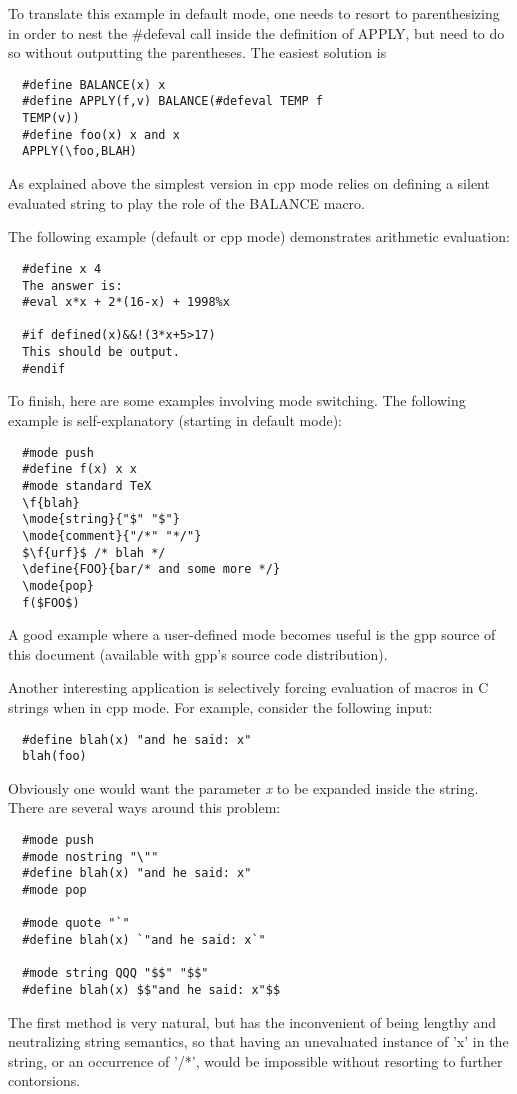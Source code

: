 To translate this example in default mode, one needs to resort to
parenthesizing in order to nest the \#defeval call inside the definition
of APPLY, but need to do so without outputting the parentheses. The
easiest solution is
\begin{verbatim}
  #define BALANCE(x) x
  #define APPLY(f,v) BALANCE(#defeval TEMP f
  TEMP(v))
  #define foo(x) x and x
  APPLY(\foo,BLAH)
\end{verbatim}
As explained above the simplest version in cpp mode relies on defining
a silent evaluated string to play the role of the BALANCE macro.


The following example (default or cpp mode) demonstrates arithmetic 
evaluation:
\begin{verbatim}
  #define x 4
  The answer is:
  #eval x*x + 2*(16-x) + 1998%x

  #if defined(x)&&!(3*x+5>17)
  This should be output.
  #endif
\end{verbatim}
To finish, here are some examples involving mode switching. 
The following example is self-explanatory (starting in default mode):
\begin{verbatim}
  #mode push
  #define f(x) x x
  #mode standard TeX
  \f{blah}
  \mode{string}{"$" "$"}
  \mode{comment}{"/*" "*/"}
  $\f{urf}$ /* blah */
  \define{FOO}{bar/* and some more */}
  \mode{pop}
  f($FOO$)
\end{verbatim}
A good example where a user-defined mode becomes useful is the gpp 
source of this document (available with gpp's source code distribution).


Another interesting application is selectively forcing evaluation of macros 
in C strings when in cpp mode. For example, consider the following input:
\begin{verbatim}
  #define blah(x) "and he said: x"
  blah(foo)
\end{verbatim}
Obviously one would want the parameter {\it x} to be expanded inside the
string. There are several ways around this problem:
\begin{verbatim}
  #mode push
  #mode nostring "\""
  #define blah(x) "and he said: x"
  #mode pop

  #mode quote "`"
  #define blah(x) `"and he said: x`"

  #mode string QQQ "$$" "$$"
  #define blah(x) $$"and he said: x"$$
\end{verbatim}
The first method is very natural, but has the inconvenient of being lengthy
and neutralizing string semantics, so that having an unevaluated instance
of 'x' in the string, or an occurrence of '/*', would be impossible without
resorting to further contorsions. 

